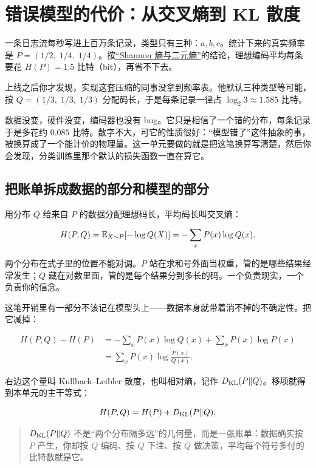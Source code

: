 \section{错误模型的代价：从交叉熵到 KL 散度}
\label{sec:07-Information-Theory/03-Divergences/01}

一条日志流每秒写进上百万条记录，类型只有三种：\(a,b,c\)。统计下来的真实频率是 \(P=(1/2,\;1/4,\;1/4)\)。按\hyperref[sec:07-Information-Theory/01-Information-and-Entropy/02]{``Shannon 熵与二元熵''}的结论，理想编码平均每条要花 \(H(P)=1.5\) 比特（bit），再省不下去。

上线之后你才发现，实现这套压缩的同事没拿到频率表。他默认三种类型等可能，按 \(Q=(1/3,\;1/3,\;1/3)\) 分配码长，于是每条记录一律占 \(\log_2 3\approx 1.585\) 比特。

数据没变，硬件没变，编码器也没有 bug。它只是相信了一个错的分布，每条记录于是多花约 \(0.085\) 比特。数字不大，可它的性质很好：``模型错了''这件抽象的事，被换算成了一个能计价的物理量。这一单元要做的就是把这笔换算写清楚，然后你会发现，分类训练里那个默认的损失函数一直在算它。

\subsection{把账单拆成数据的部分和模型的部分}

用分布 \(Q\) 给来自 \(P\) 的数据分配理想码长，平均码长叫交叉熵：

\[
H(P, Q) = \mathbb{E}_{X\sim P}[-\log Q(X)] = -\sum_x P(x) \log Q(x).
\]

两个分布在式子里的位置不能对调。\(P\) 站在求和号外面当权重，管的是哪些结果经常发生；\(Q\) 藏在对数里面，管的是每个结果分到多长的码。一个负责现实，一个负责你的信念。

这笔开销里有一部分不该记在模型头上——数据本身就带着消不掉的不确定性。把它减掉：

\[
\begin{aligned}
H(P, Q) - H(P)
&= -\sum_x P(x) \log Q(x) + \sum_x P(x) \log P(x) \\
&= \sum_x P(x) \log \frac{P(x)}{Q(x)}.
\end{aligned}
\]

右边这个量叫 Kullback--Leibler 散度，也叫相对熵，记作 \(D_{\mathrm{KL}}(P \| Q)\)。移项就得到本单元的主干等式：

\[
H(P, Q) = H(P) + D_{\mathrm{KL}}(P \| Q).
\]

\begin{quote}
\(D_{\mathrm{KL}}(P\|Q)\) 不是``两个分布隔多远''的几何量，而是一张账单：数据确实按 \(P\) 产生，你却按 \(Q\) 编码、按 \(Q\) 下注、按 \(Q\) 做决策，平均每个符号多付的比特数就是它。
\end{quote}

